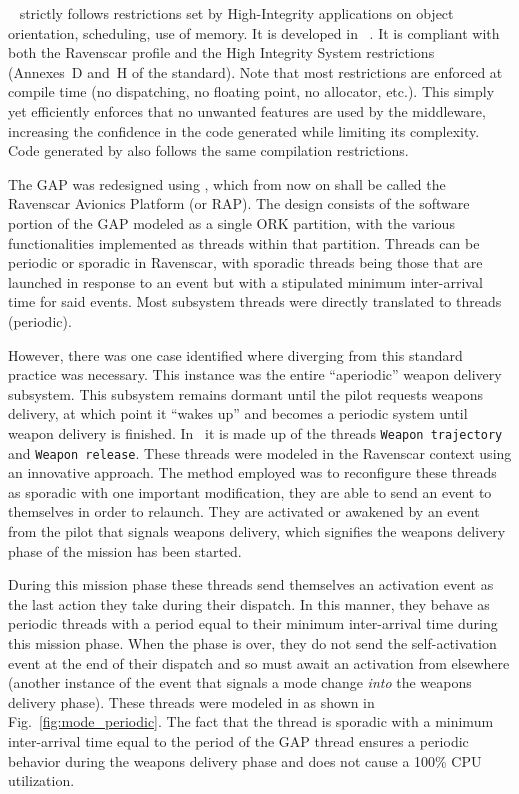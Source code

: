 \polyorbhi{}~\cite{hugues@isorc07} strictly follows restrictions set
by High-Integrity applications on object orientation, scheduling, use
of memory. It is developed in \newada~\cite{arm05}. It is compliant
with both the Ravenscar profile and the High Integrity System
restrictions (Annexes~D and~H of the \newada{} standard). Note that
most restrictions are enforced at compile time (no dispatching, no
floating point, no allocator, etc.). This simply yet efficiently
enforces that no unwanted features are used by the middleware,
increasing the confidence in the code generated while limiting its
complexity. Code generated by \ocarina{} also follows the same
compilation restrictions.

The GAP was redesigned using \aadl, which from now on shall be called
the Ravenscar Avionics Platform (or RAP). The design consists of the
software portion of the GAP modeled as a single ORK partition, with
the various functionalities implemented as threads within that
partition. Threads can be periodic or sporadic in Ravenscar, with
sporadic threads being those that are launched in response to an event
but with a stipulated minimum inter-arrival time for said events. Most
subsystem threads were directly translated to \aadl threads
(periodic).

However, there was one case identified where diverging from this
standard practice was necessary. This instance was the entire
``aperiodic'' weapon delivery subsystem. This subsystem remains
dormant until the pilot requests weapons delivery, at which point it
``wakes up'' and becomes a periodic system until weapon delivery is
finished. In~\cite{locke@sei90} it is made up of the threads
\texttt{Weapon trajectory} and \texttt{Weapon release}. These threads
were modeled in the Ravenscar context using an innovative
approach. The method employed was to reconfigure these threads as
sporadic with one important modification, they are able to send an
event to themselves in order to relaunch. They are activated or
awakened by an event from the pilot that signals weapons delivery,
which signifies the weapons delivery phase of the mission has been
started.

During this mission phase these threads send themselves an activation
event as the last action they take during their dispatch. In this
manner, they behave as periodic threads with a period equal to their
minimum inter-arrival time during this mission phase. When the phase
is over, they do not send the self-activation event at the end of
their dispatch and so must await an activation from elsewhere (another
instance of the event that signals a mode change \emph{into} the
weapons delivery phase). These threads were modeled in \aadl as shown
in Fig.~\ref{fig:mode_periodic}. The fact that the thread is sporadic
with a minimum inter-arrival time equal to the period of the GAP
thread ensures a periodic behavior during the weapons delivery phase
and does not cause a 100\% CPU utilization.

